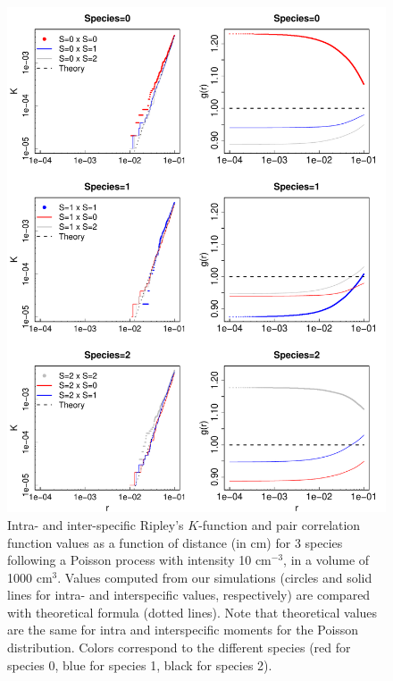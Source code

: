 \documentclass[english]{article}
\begin{document}
\begin{figure}[H]
\begin{centering}
\includegraphics[height=0.85\textheight]{../code/figure/K_PCF_Poisson}
\par\end{centering}
\caption{Intra- and inter-specific Ripley's $K$-function and pair correlation
function values as a function of distance (in cm) for 3 species following
a Poisson process with intensity 10 cm$^{-3}$, in a volume of 1000
cm$^{3}$. Values computed from our simulations (circles and solid
lines for intra- and interspecific values, respectively) are compared
with theoretical formula (dotted lines). Note that theoretical values
are the same for intra and interspecific moments for the Poisson distribution.
Colors correspond to the different species (red for species 0, blue
for species 1, black for species 2). }
\end{figure}
\end{document}
